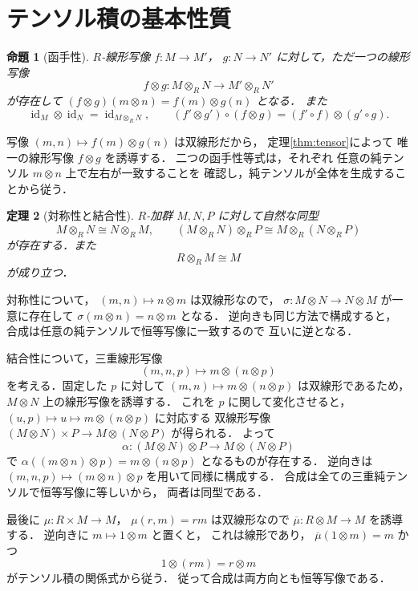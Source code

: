 \documentclass[a5paper,10pt,onecolumn]{jsarticle}
\makeatletter
\theoremstyle{mathnotetheorem}
\newtheorem{theorem}{定理}[section]
\newtheorem{proposition}[theorem]{命題}
\renewcommand{\proofname}{証明}
\renewenvironment{proof}[1][\proofname]{%
  \par\pushQED{\qed}\normalfont\topsep4\p@\@plus2\p@\relax
  \trivlist\item[\hskip\labelsep\bfseries #1]\ignorespaces
}{\popQED\endtrivlist\@endpefalse}
\makeatother
\begin{document}
\section{テンソル積の基本性質}

\begin{proposition}[函手性]\label{prop:tensor-functor}
$R$-線形写像 $f:M\to M'$，
$g:N\to N'$ に対して，ただ一つの線形写像
\[
 f\otimes g:M\otimes_RN\to M'\otimes_RN'
\]
が存在して
$(f\otimes g)(m\otimes n)=f(m)\otimes g(n)$ となる．
また
\[
 \operatorname{id}_M\otimes\operatorname{id}_N
 =\operatorname{id}_{M\otimes_RN},\qquad
 (f'\otimes g')\circ(f\otimes g)
 =(f'\circ f)\otimes(g'\circ g).
\]
\end{proposition}
\begin{proof}
写像
$(m,n)\mapsto f(m)\otimes g(n)$ は双線形だから，
定理\ref{thm:tensor}によって
唯一の線形写像 $f\otimes g$ を誘導する．
二つの函手性等式は，それぞれ
任意の純テンソル $m\otimes n$ 上で左右が一致することを
確認し，純テンソルが全体を生成することから従う．
\end{proof}

\begin{theorem}[対称性と結合性]\label{thm:tensor-basic}
$R$-加群 $M,N,P$ に対して自然な同型
\[
 M\otimes_RN\cong N\otimes_RM,\qquad
 (M\otimes_RN)\otimes_RP\cong M\otimes_R(N\otimes_RP)
\]
が存在する．また
\[
 R\otimes_RM\cong M
\]
が成り立つ．
\end{theorem}
\begin{proof}
対称性について，
$(m,n)\mapsto n\otimes m$ は双線形なので，
$\sigma:M\otimes N\to N\otimes M$ が一意に存在して
$\sigma(m\otimes n)=n\otimes m$ となる．
逆向きも同じ方法で構成すると，
合成は任意の純テンソルで恒等写像に一致するので
互いに逆となる．

結合性について，三重線形写像
\[
 (m,n,p)\longmapsto m\otimes(n\otimes p)
\]
を考える．固定した $p$ に対して
$(m,n)\mapsto m\otimes(n\otimes p)$ は双線形であるため，
$M\otimes N$ 上の線形写像を誘導する．
これを $p$ に関して変化させると，
$(u,p)\mapsto u\mapsto m\otimes(n\otimes p)$ に対応する
双線形写像
$(M\otimes N)\times P\to M\otimes(N\otimes P)$ が得られる．
よって
\[
 \alpha:(M\otimes N)\otimes P\to M\otimes(N\otimes P)
\]
で
$\alpha((m\otimes n)\otimes p)=m\otimes(n\otimes p)$
となるものが存在する．
逆向きは
$(m,n,p)\mapsto(m\otimes n)\otimes p$ を用いて同様に構成する．
合成は全ての三重純テンソルで恒等写像に等しいから，
両者は同型である．

最後に
$\mu:R\times M\to M$，
$\mu(r,m)=rm$ は双線形なので
$\overline\mu:R\otimes M\to M$ を誘導する．
逆向きに $m\mapsto1\otimes m$ と置くと，
これは線形であり，
$\overline\mu(1\otimes m)=m$ かつ
\[
 1\otimes(rm)=r\otimes m
\]
がテンソル積の関係式から従う．
従って合成は両方向とも恒等写像である．
\end{proof}
\end{document}
